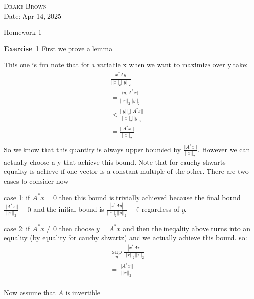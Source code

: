 \documentclass[12pt]{article}
\newenvironment{exercise}[1]{\vspace{.1in}\noindent\textbf{Exercise #1 \hspace{.05em}}}{}
\theoremstyle{definition}
\theoremstyle{remark}
\begin{document}
\begin{flushright}
	\textsc{Drake Brown}  \\
	Date: Apr 14, 2025
\end{flushright}
\begin{center}
	Homework 1
\end{center}
\begin{exercise}{1}
	First we prove a lemma

	This one is fun note that for a variable x when we want to maximize over y take:
	\begin{align}
		\frac{|x^*Ay|}{||x||_2||y||_2}                    \\
		=\frac{|\langle y, A^*x\rangle |}{||x||_2||y||_2} \\
		\leq\frac{|| y||_2 ||A^*x ||}{||x||_2||y||_2}     \\
		=\frac{||A^*x ||}{||x||_2}                        \\
	\end{align}
	So we know that this quantity is always upper bounded by $\frac{||A^*x||}{||x||_2}$. However we can actually choose a y that achieve this bound. Note that for cauchy shwarts equality is achieve if one vector is a constant multiple of the other. There are two cases to consider now.

	case 1: if $A^*x=0$ then this bound is trivially achieved because the final bound $\frac{||A^*x ||}{||x||_2}=0$ and the initial bound is $\frac{|x^*Ay|}{||x||_2||y||_2}=0$ regardless of $y$.

	case 2: if $A^*x\neq 0$ then choose $y=A^*x$ and then the ineqality above turns into an equality (by equality for cauchy shwartz) and we actually achieve this bound. so:
	\begin{align}
		\sup_y\frac{|x^*Ay|}{||x||_2||y||_2} \\
		=\frac{||A^*x ||}{||x||_2}           \\
	\end{align}

	Now assume that $A$ is invertible


\end{exercise}
\end{document}
